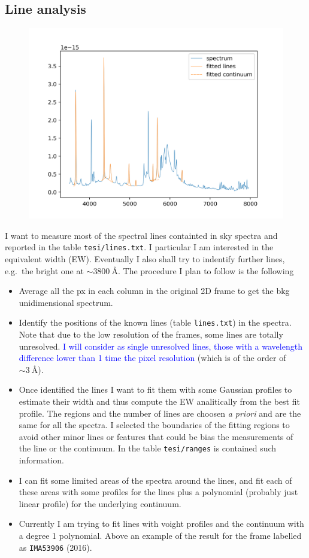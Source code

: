 \documentclass{article}
\newcommand{\arbitrario}[1]{\textcolor{blue}{#1}}
\begin{document}
\subsection{Line analysis}
	\begin{figure}[h!]
	\centering
	\includegraphics[width=.65\textwidth]{prova_fit}
\end{figure}
I want to measure most of the spectral lines containted in sky spectra and reported in the table \texttt{tesi/lines.txt}. I particular I am interested in the equivalent width (EW). Eventually I also shall try to indentify further lines, e.g.\ the bright one at $\sim\SI{3800}{\angstrom}$. The procedure I plan to follow is the following
\begin{itemize}
	\item Average all the px in each column in the original 2D frame to get the bkg unidimensional spectrum.
	\item Identify the positions of the known lines (table \texttt{lines.txt}) in the spectra. Note that due to the low resolution of the frames, some lines are totally unresolved. \arbitrario{I will consider as single unresolved lines, those with a wavelength difference lower than 1 time the pixel resolution} (which is of the order of $\sim\SI{3}{\angstrom}$).
	\item Once identified the lines I want to fit them with some Gaussian profiles to estimate their width and thus compute the EW analitically from the best fit profile. The regions and the number of lines are choosen \textit{a priori} and are the same for all the spectra. I selected the boundaries of the fitting regions to avoid other minor lines or features that could be bias the measurements of the line or the continuum. In the table \texttt{tesi/ranges} is contained such information.
	\item I can fit some limited areas of the spectra around the lines, and fit each of these areas with some profiles for the lines plus a polynomial (probably just linear profile) for the underlying continuum.
	\item Currently I am trying to fit lines with voight profiles and the continuum with a degree 1 polynomial. Above an example of the result for the frame labelled as \texttt{IMA53906} (2016).
\end{itemize}
\end{document}
